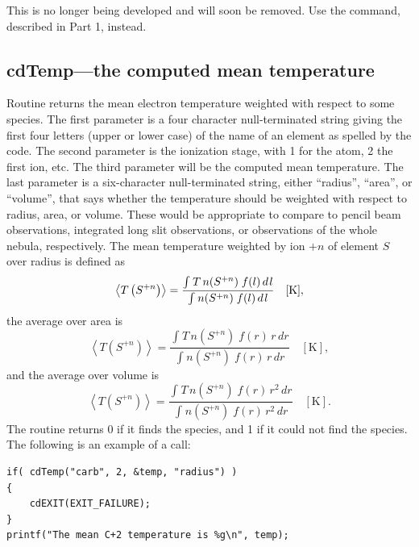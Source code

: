 This is no longer being developed and will soon be removed.
Use the
 command, described in Part 1, instead.

\subsection{cdTemp---the computed mean temperature}
\label{sec:SubroutineCdTemp}

Routine  returns the mean electron temperature weighted with respect
to some species.
The first parameter is a four character null-terminated
string giving the first four letters (upper or lower case) of the name of
an element as spelled by the code.
The second parameter is the ionization
stage, with 1 for the atom, 2 the first ion, etc.
The third parameter will
be the computed mean temperature.
The last parameter is a six-character
null-terminated string, either ``radius'', ``area'', or ``volume'', that says whether
the temperature should be weighted with respect to radius, area, or volume.
These would be appropriate to compare to pencil beam observations,
integrated long slit observations, or observations of the whole nebula, respectively.
The mean temperature weighted by ion $+n$ of element $S$ over radius
is defined as
\begin{equation}
\left\langle {T\left( {{S^{ + n}}} \right)} \right\rangle  =
\frac{{\int_{}^{} {T\,n({S^{ + n}})\;f(l)\,d{\kern 1pt} l} }}{{\int_{}^{}
{n({S^{ + n}})\;f(l)\,d{\kern 1pt} l} }}\quad [\mathrm{K}],
\end{equation}
the average over area is
\begin{equation}
\left\langle {T\left( {{S^{ + n}}} \right)} \right\rangle  =
\frac{{\int_{}^{} {T\,n({S^{ + n}})\;f(r)\,r\,dr} }}{{\int_{}^{} {n({S^{ +
n}})\;f(r)\,r\,dr} }}
\quad [\mathrm{K}],
\end{equation}
and the average over volume  is
\begin{equation}
\left\langle {T\left( {{S^{ + n}}} \right)} \right\rangle  =
\frac{{\int_{}^{} {T\,n({S^{ + n}})\;f(r)\,r^2\,dr} }}{{\int_{}^{} {n({S^{ +
n}})\;f(r)\,r^2\,dr} }}
\quad [\mathrm{K}] .
\end{equation}
The routine returns 0 if it finds the species, and 1 if it could not find
the species.  The following is an example of a call:
\begin{verbatim}
if( cdTemp("carb", 2, &temp, "radius") )
{
    cdEXIT(EXIT_FAILURE);
}
printf("The mean C+2 temperature is %g\n", temp);
\end{verbatim}

